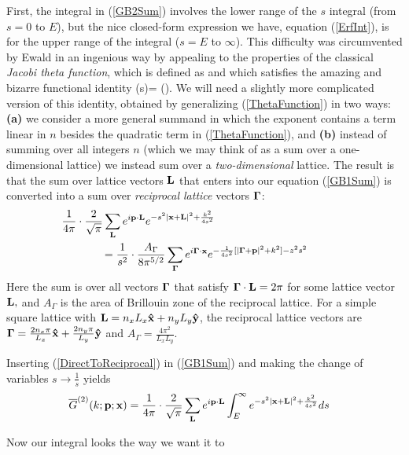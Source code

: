 \documentclass[letterpaper]{article}
\newcommand{\GB}{\overline{G}}
\begin{document}
First, the integral in (\ref{GB2Sum}) involves the lower range of the 
$s$ integral (from $s=0$ to $E$), but the nice closed-form
expression we have, equation (\ref{ErfInt}), is for the upper range 
of the integral ($s=E$ to $\infty$). This difficulty was circumvented 
by Ewald in an ingenious way by appealing to the properties of the 
classical \textit{Jacobi theta function}, which is defined as 
and which satisfies the amazing and bizarre functional identity 
{ \theta(s)=\sqrt{} \cdot \theta\left(\right).}
We will need a slightly more complicated version of this identity,
obtained by generalizing (\ref{ThetaFunction}) in two ways: 
\textbf{(a)} we consider a more general summand in which the exponent
contains a term linear in $n$ besides the quadratic term 
in (\ref{ThetaFunction}), and 
\textbf{(b)} instead of summing over all integers $n$ (which we may 
think of as a sum over a one-dimensional lattice) we instead sum 
over a \textit{two-dimensional} lattice.
The result is that the sum over lattice vectors $\mathbf{L}$ that enters into
our equation (\ref{GB1Sum}) is converted into a sum over
\textit{reciprocal lattice} vectors $\boldsymbol{\Gamma}$:
\begin{align}
&\hspace{-0.5in}
 \frac{1}{4\pi} \cdot \frac{2}{\sqrt\pi} \sum_{\vb L} e^{i \vb p \cdot \vb L}
 e^{-s^2|\vb x + \vb L|^2 + \frac{k^2}{4s^2}}
\nn
&=\frac{1}{s^2} \cdot \frac{A_\Gamma}{8\pi^{5/2}} 
 \sum_{\BG} e^{i\BG \cdot \vb x} 
            e^{-\frac{1}{4s^2}[|\BG + \vb p|^2 + k^2] - z^2 s^2}
\label{DirectToReciprocal}
\end{align}
Here the sum is over all vectors $\boldsymbol{\Gamma}$ that satisfy 
$\boldsymbol{\Gamma} \cdot \mathbf{L}=2\pi$ for some lattice vector $\mathbf{L},$
and $A_{\Gamma}$ is the area of Brillouin zone of the 
reciprocal lattice. For a simple square lattice with
$\mathbf{L}=n_x L_x\mathbf{\hat x} + n_y L_y\mathbf{\hat y}$, the reciprocal
lattice vectors are 
$\boldsymbol{\Gamma}=\frac{2n_x \pi}{L_x}\mathbf{\hat x} + \frac{2n_y \pi}{L_y}\mathbf{\hat y}$
and $A_\Gamma=\frac{4\pi^2}{L_x L_y}$.

Inserting (\ref{DirectToReciprocal}) in (\ref{GB1Sum}) and making 
the change of variables $s \to \frac{1}{s}$ yields 
\begin{align*}

\label{GB2Sum2}
\GB^{(2)}(k; \vb p; \vb x) 
&= \frac{1}{4\pi} \cdot \frac{2}{\sqrt{\pi}}
   \sum_{\vb L} e^{i\vb p \cdot \vb L} \int_E^\infty e^{-s^2 |\vb x + \vb L|^2 + \frac{k^2}{4s^2}} ds
\end{align*}

Now our integral looks the way we want it to
\end{document}
